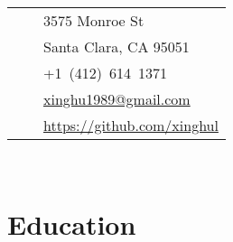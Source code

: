 \documentclass[10pt]{article}
\def\phone{{\FA \faPhone}}
\def\envelope{{\FA \faEnvelope}}
\def\home{{\FA \faHome}}
\def\github{{\FA \faGithub}}
\begin{document}
\color{text1} %


\par{\\[8pt]
	

\begin{minipage}[t]{0.5\textwidth} %
\vspace{0pt} %

\colorbox{shade}{\ttfamily\textcolor{text1}{
\begin{tabular}{@{} m{1cm} r m{6.5cm}}
& \home & 3575 Monroe St \\
& & Santa Clara, CA 95051 \\ %
& \phone & +1~(412)~614~1371 \\ %
& \envelope & \href{mailto:xinghu1989@gmail.com}{xinghu1989@gmail.com} \\ %
& \github & \href{https://github.com/xinghul}{https://github.com/xinghul} \\ %
\end{tabular}
}
}\\[1pt]


\section{Education} 

\begin{tabular}{rl} %



\end{tabular}
\end{minipage}}
\end{document}

